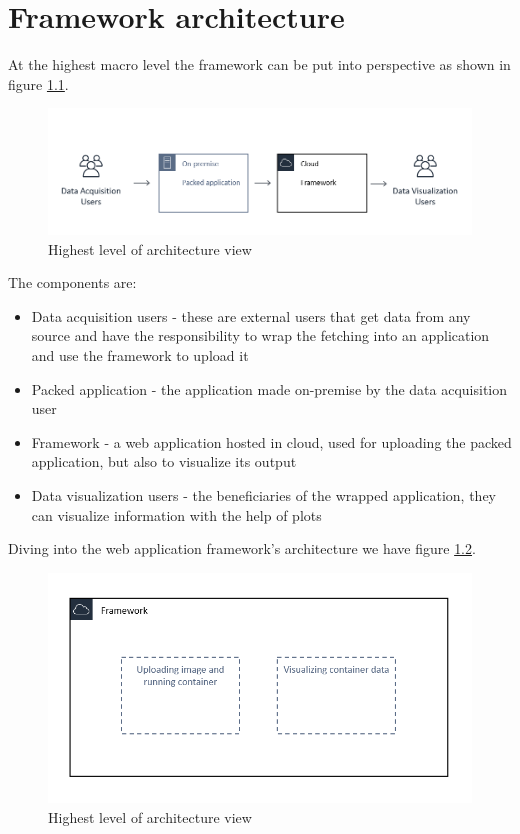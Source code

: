 \chapter{Framework architecture}
\label{chap:03}

At the highest macro level the framework can be put into perspective as shown in figure \ref{fig:architecture1}. 


\begin{figure}[h]
	\centering
	\includegraphics[width=1\linewidth]{./images/architecture/highest_lvl.png}
	\caption{Highest level of architecture view}
	\label{fig:architecture1}
\end{figure}

The components are:
\begin{itemize}
	\item Data acquisition users -  these are external users that get data from any source and have the responsibility to wrap the fetching into an application and use the framework to upload it
	\item Packed application - the application made on-premise by the data acquisition user
	\item Framework - a web application hosted in cloud, used for uploading the packed application, but also to visualize its output
	\item Data visualization users - the beneficiaries of the wrapped application, they can visualize information with the help of plots
\end{itemize}

Diving into the web application framework's architecture we have figure \ref{fig:architecture2}.

\begin{figure}[h]
	\centering
	\includegraphics[width=1\linewidth]{./images/architecture/framework.png}
	\caption{Highest level of architecture view}
	\label{fig:architecture2}
\end{figure}

